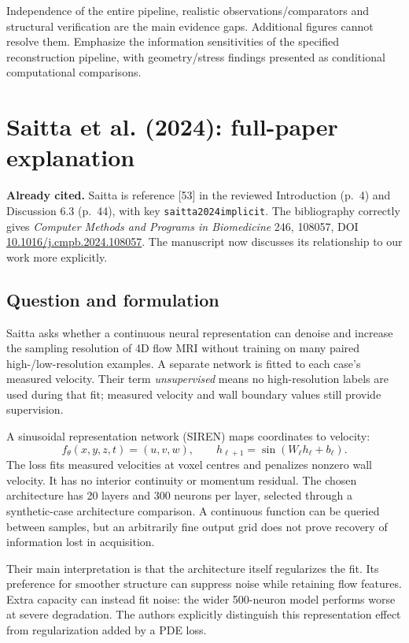 \documentclass[11pt,a4paper]{article}
\begin{document}
Independence of the entire pipeline, realistic observations/comparators and structural verification are the main evidence gaps. Additional figures cannot resolve them. Emphasize the information sensitivities of the specified reconstruction pipeline, with geometry/stress findings presented as conditional computational comparisons.

\section{Saitta et al. (2024): full-paper explanation}

\textbf{Already cited.} Saitta is reference [53] in the reviewed Introduction (p.~4) and Discussion 6.3 (p.~44), with key \texttt{saitta2024implicit}. The bibliography correctly gives \emph{Computer Methods and Programs in Biomedicine} 246, 108057, DOI \href{https://doi.org/10.1016/j.cmpb.2024.108057}{10.1016/j.cmpb.2024.108057}. The manuscript now discusses its relationship to our work more explicitly.

\subsection{Question and formulation}

Saitta asks whether a continuous neural representation can denoise and increase the sampling resolution of 4D flow MRI without training on many paired high-/low-resolution examples. A separate network is fitted to each case's measured velocity. Their term \emph{unsupervised} means no high-resolution labels are used during that fit; measured velocity and wall boundary values still provide supervision.

A sinusoidal representation network (SIREN) maps coordinates to velocity:
\[
 f_\theta(x,y,z,t)=(u,v,w), \qquad
 h_{\ell+1}=\sin(W_\ell h_\ell+b_\ell).
\]
The loss fits measured velocities at voxel centres and penalizes nonzero wall velocity. It has no interior continuity or momentum residual. The chosen architecture has 20 layers and 300 neurons per layer, selected through a synthetic-case architecture comparison. A continuous function can be queried between samples, but an arbitrarily fine output grid does not prove recovery of information lost in acquisition.

Their main interpretation is that the architecture itself regularizes the fit. Its preference for smoother structure can suppress noise while retaining flow features. Extra capacity can instead fit noise: the wider 500-neuron model performs worse at severe degradation. The authors explicitly distinguish this representation effect from regularization added by a PDE loss.
\end{document}
